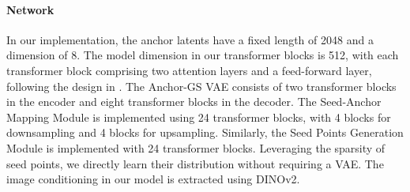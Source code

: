 %
%


\paragraph{Network}
In our implementation, the anchor latents have a fixed length of 2048 and a dimension of 8. The model dimension in our transformer blocks is 512, with each transformer block comprising two attention layers and a feed-forward layer, following the design in \cite{zou2024triplane}. The Anchor-GS VAE consists of two transformer blocks in the encoder and eight transformer blocks in the decoder. 
%
The Seed-Anchor Mapping Module is implemented using 24 transformer blocks, with 4 blocks for downsampling and 4 blocks for upsampling. Similarly, the Seed Points Generation Module is implemented with 24 transformer blocks. Leveraging the sparsity of seed points, we directly learn their distribution without requiring a VAE. The image conditioning in our model is extracted using DINOv2\cite{oquab2023dinov2}.


